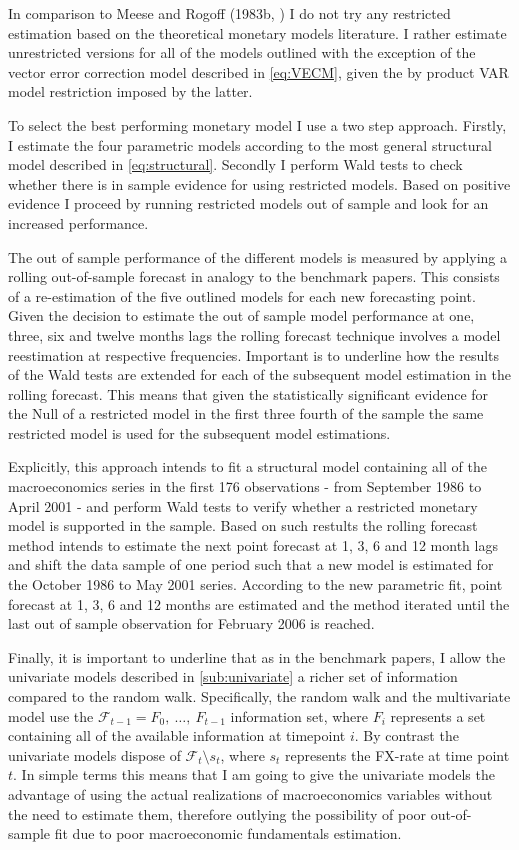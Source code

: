 In comparison to Meese and Rogoff (1983b, \cite{MeeseRogoffb}) I do
not try any restricted estimation based on the theoretical monetary
models literature. I rather estimate unrestricted versions for all of
the models outlined with the exception of the vector error correction
model described in \ref{eq:VECM}, given the by product VAR model
restriction imposed by the latter.

To select the best performing monetary model I use a two step
approach. Firstly, I estimate the four parametric models according to
the most general structural model described in
\ref{eq:structural}. Secondly I perform Wald tests to check whether
there is in sample evidence for using restricted models. Based on
positive evidence I proceed by running restricted models out of
sample and look for an increased performance.

The out of sample performance of the different models is measured by
applying a rolling out-of-sample forecast in analogy to the benchmark
papers. This consists of a re-estimation of the five outlined models
for each new forecasting point. Given the decision to estimate the out
of sample model performance at one, three, six and twelve months lags
the rolling forecast technique involves a model reestimation at
respective frequencies. Important is to underline how the results of
the Wald tests are extended for each of the subsequent model
estimation in the rolling forecast. This means that given the
statistically significant evidence for the Null of a restricted model
in the first three fourth of the sample the same restricted model is
used for the subsequent model estimations.

Explicitly, this approach intends to fit a structural model containing
all of the macroeconomics series in the first 176 observations - from
September 1986 to April 2001 - and perform Wald tests to verify
whether a restricted monetary model is supported in the sample. Based
on such restults the rolling forecast method intends to estimate the
next point forecast at 1, 3, 6 and 12 month lags and shift the data
sample of one period such that a new model is estimated for the
October 1986 to May 2001 series. According to the new parametric fit,
point forecast at 1, 3, 6 and 12 months are estimated and the method
iterated until the last out of sample observation for February 2006 is
reached.

Finally, it is important to underline that as in the benchmark papers,
I allow the univariate models described in \ref{sub:univariate} a
richer set of information compared to the random walk.  Specifically,
the random walk and the multivariate model use the
$\mathscr{F}_{t-1} = {F_0, \ \dots, \ F_{t-1}}$ information set, where
$F_i$ represents a set containing all of the available information at
timepoint $i$.  By contrast the univariate models dispose of
$\mathscr{F}_t \setminus s_t$, where $s_t$ represents the FX-rate at
time point $t$.  In simple terms this means that I am going to give
the univariate models the advantage of using the actual realizations
of macroeconomics variables without the need to estimate them,
therefore outlying the possibility of poor out-of-sample fit due to
poor macroeconomic fundamentals estimation.

